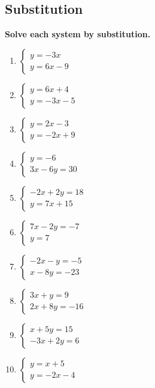 \documentclass[12pt]{book}
\theoremstyle{definition}
\begin{document}
\subsection*{Substitution}
{\bf Solve each system by substitution.}
\begin{multicols}{3}
	\begin{enumerate}
  \item $\begin{cases} 
	y = - 3 x\\
	y = 6 x - 9
  \end{cases}$
  \item $\begin{cases} 
  y = 6 x + 4\\
	y = - 3 x - 5
  \end{cases}$
  \item $\begin{cases} 
  y = 2 x - 3\\
	y = - 2 x + 9
  \end{cases}$
  \item $\begin{cases} 
  y = - 6\\
	3 x - 6 y = 30
  \end{cases}$
  \item $\begin{cases} 
  - 2 x + 2 y = 18\\
  y = 7 x + 15
  \end{cases}$
  \item $\begin{cases} 
  7 x - 2 y = - 7\\
  y = 7
  \end{cases}$
  \item $\begin{cases} 
  - 2 x - y = - 5\\
  x - 8 y = - 23
  \end{cases}$
  \item $\begin{cases} 
  3 x + y = 9\\
	2 x + 8 y = - 16
  \end{cases}$
  \item $\begin{cases} 
  x + 5 y = 15\\
  - 3 x + 2 y = 6
  \end{cases}$
  \item $\begin{cases} 
  y = x + 5\\
	y = - 2 x - 4
  \end{cases}$

\end{enumerate}
\end{multicols}
\end{document}
